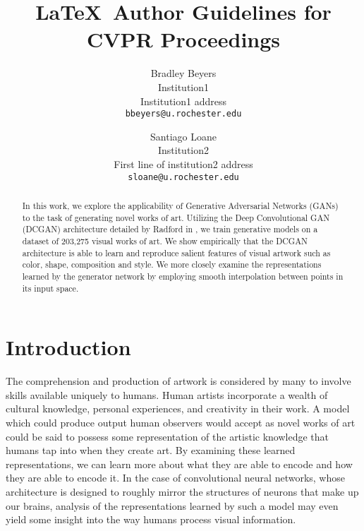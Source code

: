 \documentclass[10pt,twocolumn,letterpaper]{article}
\begin{document}
\title{\LaTeX\ Author Guidelines for CVPR Proceedings}

\author{Bradley Beyers\\
	Institution1\\
	Institution1 address\\
	{\tt\small bbeyers@u.rochester.edu}
	\and
	Santiago Loane\\
	Institution2\\
	First line of institution2 address\\
	{\tt\small sloane@u.rochester.edu}
}


\maketitle

\begin{abstract}
   In this work, we explore the applicability of Generative Adversarial Networks (GANs)
   to the task of generating novel works of art. Utilizing the Deep Convolutional GAN (DCGAN)
   architecture detailed by Radford \etal in \cite{radford2015unsupervised}, we train
   generative models on a dataset of 203,275 visual works of art. We show empirically that the
   DCGAN architecture is able to learn and reproduce salient features of visual artwork such as
   color, shape, composition and style. We more closely examine the representations learned by
   the generator network by employing smooth interpolation between points in its input space.
\end{abstract}

\section{Introduction}
The comprehension and production of artwork is considered by many to involve skills available
uniquely to humans. Human artists incorporate a wealth of cultural knowledge, personal experiences,
and creativity in their work. A model which could produce output human observers would accept
as novel works of art could be said to possess some representation of the artistic knowledge
that humans tap into when they create art. By examining these learned representations, we can
learn more about what they are able to encode and how they are able to encode it. In the case of convolutional neural networks, whose architecture is designed to roughly mirror the structures of neurons that make up our brains, analysis of the representations learned by such a model may even yield some insight into the way humans process visual information.
\end{document}
